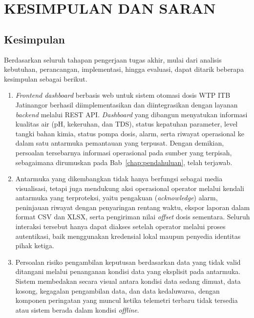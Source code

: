 \cleardoublepage
\chapter{KESIMPULAN DAN SARAN}
\label{chap:kesimpulan-saran}

\section{Kesimpulan}
Berdasarkan seluruh tahapan pengerjaan tugas akhir, mulai dari analisis kebutuhan, perancangan, implementasi, 
hingga evaluasi, dapat ditarik beberapa kesimpulan sebagai berikut.

\begin{enumerate}
    \item \textit{Frontend dashboard} berbasis web untuk sistem otomasi dosis WTP ITB Jatinangor berhasil 
    diimplementasikan dan diintegrasikan dengan layanan \textit{backend} melalui REST API. \textit{Dashboard} 
    yang dibangun menyatukan informasi kualitas air (pH, kekeruhan, dan TDS), status kepatuhan parameter, level 
    tangki bahan kimia, status pompa dosis, alarm, serta riwayat operasional ke dalam satu antarmuka pemantauan 
    yang terpusat. Dengan demikian, persoalan tersebarnya informasi operasional pada sumber yang terpisah, 
    sebagaimana dirumuskan pada Bab~\ref{chap:pendahuluan}, telah terjawab.

    \item Antarmuka yang dikembangkan tidak hanya berfungsi sebagai media visualisasi, tetapi juga mendukung 
    aksi operasional operator melalui kendali antarmuka yang terproteksi, yaitu pengakuan (\textit{acknowledge}) 
    alarm, peninjauan riwayat dengan penyaringan rentang waktu, ekspor laporan dalam format CSV dan XLSX, serta 
    pengiriman nilai \textit{offset} dosis sementara. Seluruh interaksi tersebut hanya dapat diakses setelah 
    operator melalui proses autentikasi, baik menggunakan kredensial lokal maupun penyedia identitas pihak ketiga.

    \item Persoalan risiko pengambilan keputusan berdasarkan data yang tidak valid ditangani melalui penanganan 
    kondisi data yang eksplisit pada antarmuka. Sistem membedakan secara visual antara kondisi data sedang dimuat, 
    data kosong, kegagalan pengambilan data, dan data kedaluwarsa, dengan komponen peringatan yang muncul ketika 
    telemetri terbaru tidak tersedia atau sistem berada dalam kondisi \textit{offline}.


\end{enumerate}
